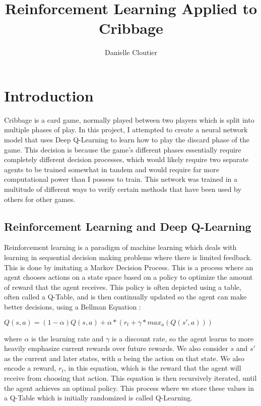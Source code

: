 \documentclass[]{article}
\title{Reinforcement Learning Applied to Cribbage}
\author{Danielle Cloutier}
\begin{document}
\maketitle

\section{Introduction}

Cribbage is a card game, normally played between two players which is split into multiple phases of play\cite{cribbage_rules}. In this project, I attempted to create a neural network model that uses Deep Q-Learning to learn how to play the discard phase of the game. This decision is because the game's different phases essentially require completely different decision processes, which would likely require two separate agents to be trained somewhat in tandem and would require far more computational power than I possess to train. This network was trained in a multitude of different ways to verify certain methods that have been used by others for other games. 

\subsection{Reinforcement Learning and Deep Q-Learning}

Reinforcement learning is a paradigm of machine learning which deals with learning in sequential decision making problems where there is limited feedback. This is done by imitating a Markov Decision Process. This is a process where an agent chooses actions on a state space based on a policy to optimize the amount of reward that the agent receives\cite{reinforcement_learning}. This policy is often depicted using a table, often called a Q-Table, and is then continually updated so the agent can make better decisions, using a Bellman Equation \cite{bellman}:

$Q(s, a) = (1 - \alpha)Q(s, a) + \alpha * (r_t + \gamma * max_a(Q(s', a)))$

where $\alpha$ is the learning rate and $\gamma$ is a discount rate, so the agent learns to more heavily emphasize current rewards over future rewards. We also consider $s$ and $s'$ as the current and later states, with $a$ being the action on that state. We also encode a reward, $r_t$, in this equation, which is the reward that the agent will receive from choosing that action. This equation is then recursively iterated, until the agent achieves an optimal policy. This process where we store these values in a Q-Table which is initially randomized is called Q-Learning\cite{reinforcement_learning}. 
\end{document}
